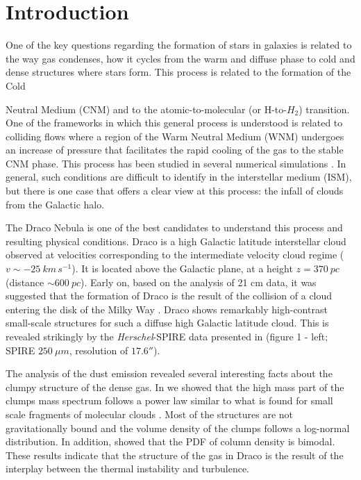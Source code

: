 \documentclass[traditabstract]{aa}
\begin{document}


\section{Introduction}
One of the key questions regarding the formation of stars in galaxies is related to the way gas condenses, how it cycles from 
the warm and diffuse phase to cold and dense structures where stars form. This process is related to the formation of the Cold 
\item Neutral Medium (CNM) and to the atomic-to-molecular (or H-to-$H_2$) transition. 
One of the frameworks in which this general process is understood is related to colliding flows where a region of the Warm 
Neutral Medium (WNM) undergoes an increase of pressure that facilitates the rapid cooling of the gas to the stable CNM phase. 
This process has been studied in several numerical simulations \citep{Hennebelle_1999,Audit_2005,Vazquez_2006,Hennebelle_2007,
Inoue_2009,Saury_2014}. In general, such conditions are difficult to identify in the interstellar medium (ISM), but there is 
one case that offers a clear view at this process: the infall of clouds from the Galactic halo.

The Draco Nebula is one of the best candidates to understand this process and resulting physical conditions. 
Draco is a high Galactic latitude interstellar cloud observed at velocities corresponding to the intermediate velocity cloud 
regime ($v\sim -25\: km\, s^{-1}$). It is located above the Galactic plane, at a height $z=370\: pc$ (distance $\sim 600\: pc$).  
Early on, based on the analysis of 21 cm data, it was suggested that the formation of Draco is the result of the collision of a 
cloud entering the disk of the Milky Way \citep{Goerigk_1983}.
Draco shows remarkably high-contrast small-scale structures for such a diffuse high Galactic latitude cloud. 
This is revealed strikingly by the \emph{Herschel}-SPIRE data presented in \cite{MAMD_2017b} (figure 1 - left; SPIRE $250\: \mu m$, 
resolution of $17.6''$).

The analysis of the dust emission revealed several interesting facts about the clumpy structure of the dense gas. 
In \cite{MAMD_2017b} we showed that the high mass part of the clumps mass spectrum follows a power law similar to what is found 
for small scale fragments of molecular clouds \cite{Peretto_2010}. Most of the structures are not gravitationally bound and 
the volume density of the clumps follows a log-normal distribution. In addition, \cite{Schneider_2017} showed that the PDF of 
column density is bimodal. These results indicate that the structure of the gas in Draco is the result of the interplay between 
the thermal instability and turbulence.
\end{document}
